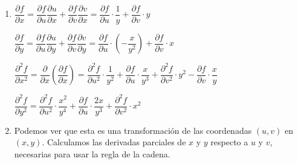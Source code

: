 \begin{enumerate}[label=\color{red}\textbf{\arabic*)}, leftmargin=*]
\item {}

$\dfrac{\partial f}{\partial x}=\dfrac{\partial f}{\partial u}\dfrac{\partial u}{\partial x}+\dfrac{\partial f}{\partial v}\dfrac{\partial v}{\partial x}=\dfrac{\partial f}{\partial u}\cdot\dfrac{1}{y}+\dfrac{\partial f}{\partial v}\cdot y$

$\dfrac{\partial f}{\partial y}=\dfrac{\partial f}{\partial u}\dfrac{\partial u}{\partial y}+\dfrac{\partial f}{\partial v}\dfrac{\partial v}{\partial y}=\dfrac{\partial f}{\partial u}\cdot\left(-\dfrac{x}{y^2}\right)+\dfrac{\partial f}{\partial v}\cdot x$

$\dfrac{\partial^2 f}{\partial x^2}=\dfrac{\partial}{\partial x}\left(\dfrac{\partial f}{\partial x}\right)=\dfrac{\partial^2 f}{\partial u^2}\cdot\dfrac{1}{y^2}+\dfrac{\partial f}{\partial u}\cdot\dfrac{x}{y^3}+\dfrac{\partial^2 f}{\partial v^2}\cdot y^2-\dfrac{\partial f}{\partial v}\cdot\dfrac{x}{y}$

$\dfrac{\partial^2 f}{\partial y^2}=\dfrac{\partial^2f}{\partial u^2}\cdot\dfrac{x^2}{y^4}+\dfrac{\partial f}{\partial u}\cdot\dfrac{2x}{y^3}+\dfrac{\partial^2 f}{\partial v^2}\cdot x^2$

\item {}

Podemos ver que esta es una transformación de las coordenadas $(u,v)$ en $(x,y)$. Calculamos las derivadas parciales de $x$ y $y$ respecto a $u$ y $v$, necesarias para usar la regla de la cadena.


\end{enumerate}
